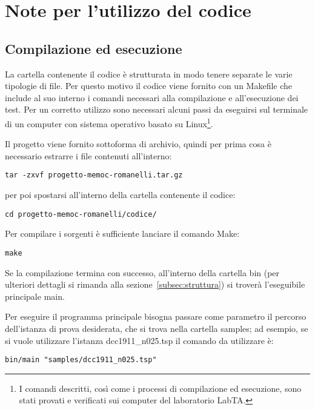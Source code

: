 
\section{Note per l'utilizzo del codice}\label{sec:codice}
\subsection{Compilazione ed esecuzione}\label{subsec:utilizzo}
La cartella contenente il codice è strutturata in modo tenere separate le varie tipologie di file.
Per questo motivo il codice viene fornito con un \textsf{Makefile} che include al suo interno i comandi
necessari alla compilazione e all'esecuzione dei test.
Per un corretto utilizzo sono necessari alcuni passi da eseguirsi sul terminale di un computer con sistema
operativo basato su Linux\footnote{I comandi descritti, così come i processi di compilazione ed esecuzione,
sono stati provati e verificati sui computer del laboratorio LabTA.}.

Il progetto viene fornito sottoforma di archivio, quindi per prima cosa è necessario estrarre i file contenuti all'interno:
\label{lst:make-passo-1}
\begin{lstlisting}[style=BashStyle]
tar -zxvf progetto-memoc-romanelli.tar.gz
\end{lstlisting}
per poi spostarsi all'interno della cartella contenente il codice:
\label{lst:make-passo-2}
\begin{lstlisting}[style=BashStyle]
cd progetto-memoc-romanelli/codice/
\end{lstlisting}
%
Per compilare i sorgenti è sufficiente lanciare il comando \textsf{Make}:
\label{lst:make-passo-3}
\begin{lstlisting}[style=BashStyle]
make
\end{lstlisting}
%
Se la compilazione termina con successo, all'interno della cartella \textsf{bin}
(per ulteriori dettagli si rimanda alla sezione~\ref{subsec:struttura}) si troverà l'eseguibile principale \textsf{main}.

Per eseguire il programma principale bisogna passare come parametro
il percorso dell'istanza di prova desiderata, che si trova nella cartella \textsf{samples};
ad esempio, se si vuole utilizzare l'istanza \textsf{dcc1911\_n025.tsp} il comando da utilizzare è:
\label{lst:make-passo-4}
\begin{lstlisting}[style=BashStyle]
bin/main "samples/dcc1911_n025.tsp"
\end{lstlisting}
%
